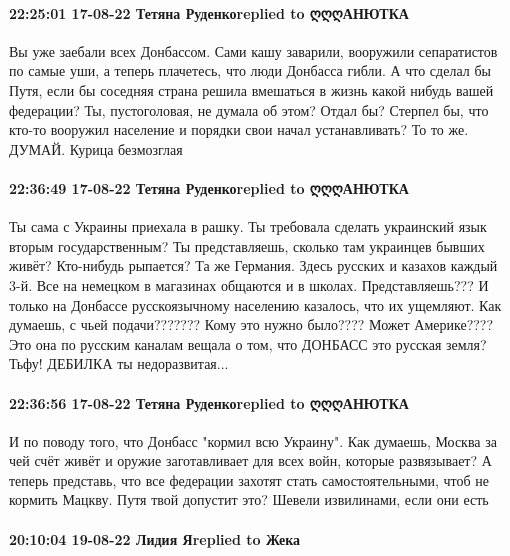  
 
 
 
 

\paragraph{22:25:01 17-08-22 Тетяна Руденкоreplied to ღღღАНЮТКА}

Вы уже заебали всех Донбассом. Сами кашу заварили, вооружили сепаратистов по
самые уши, а теперь плачетесь, что люди Донбасса гибли. А что сделал бы Путя,
если бы соседняя страна решила вмешаться в жизнь какой нибудь вашей федерации?
Ты, пустоголовая, не думала об этом? Отдал бы? Стерпел бы, что кто-то вооружил
население и порядки свои начал устанавливать? То то же. ДУМАЙ. Курица
безмозглая

\paragraph{22:36:49 17-08-22 Тетяна Руденкоreplied to ღღღАНЮТКА}

Ты сама с Украины приехала в рашку. Ты требовала сделать украинский язык вторым
государственным? Ты представляешь, сколько там украинцев бывших живёт?
Кто-нибудь рыпается? Та же Германия. Здесь русских и казахов каждый 3-й. Все на
немецком в магазинах общаются и в школах. Представляешь??? И только на Донбассе
русскоязычному населению казалось, что их ущемляют. Как думаешь, с чьей
подачи??????? Кому это нужно было???? Может Америке???? Это она по русским
каналам вещала о том, что ДОНБАСС это русская земля? Тьфу! ДЕБИЛКА ты
недоразвитая...

\paragraph{22:36:56 17-08-22 Тетяна Руденкоreplied to ღღღАНЮТКА}

И по поводу того, что Донбасс "кормил всю Украину". Как думаешь, Москва за чей
счёт живёт и оружие заготавливает для всех войн, которые развязывает? А теперь
представь, что все федерации захотят стать самостоятельными, чтоб не кормить
Мацкву. Путя твой допустит это? Шевели извилинами, если они есть

\paragraph{20:10:04 19-08-22 Лидия Яreplied to Жека}

